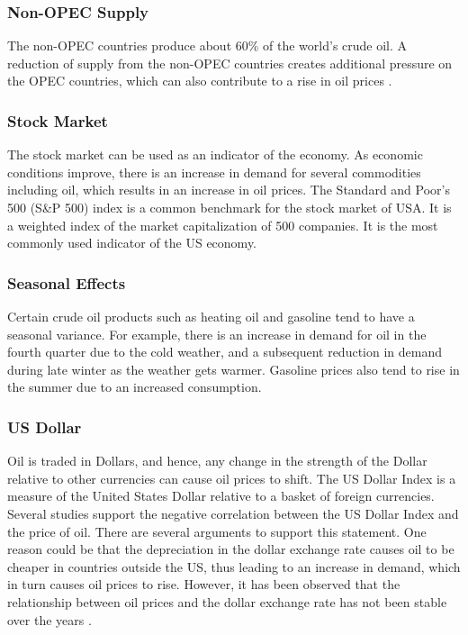 \documentclass[runningheads]{llncs}
\begin{document}
\subsubsection{Non-OPEC Supply}
The non-OPEC countries produce about 60\% of the world's crude oil. A reduction of supply from the non-OPEC countries creates additional pressure on the OPEC countries, which can also contribute to a rise in oil prices \cite{eiafactors}.

\subsubsection{Stock Market}
The stock market can be used as an indicator of the economy. As economic conditions improve, there is an increase in demand for several commodities including oil, which results in an increase in oil prices. The Standard and Poor's 500 (S\&P 500) index is a common benchmark for the stock market of USA. It is a weighted index of the market capitalization of 500 companies. It is the most commonly used indicator of the US economy.

\subsubsection{Seasonal Effects}
Certain crude oil products such as heating oil and gasoline tend to have a seasonal variance. For example, there is an increase in demand for oil in the fourth quarter due to the cold weather, and a subsequent reduction in demand during late winter as the weather gets warmer. Gasoline prices also tend to rise in the summer due to an increased consumption. 

\subsubsection{US Dollar}
Oil is traded in Dollars, and hence, any change in the strength of the Dollar relative to other currencies can cause oil prices to shift. The US Dollar Index is a measure of the United States Dollar relative to a basket of foreign currencies. Several studies support the negative correlation between the US Dollar Index and the price of oil. There are several arguments to support this statement. One reason could be that the depreciation in the dollar exchange rate causes oil to be cheaper in countries outside the US, thus leading to an increase in demand, which in turn causes oil prices to rise. However, it has been observed that the relationship between oil prices and the dollar exchange rate has not been stable over the years \cite{eiafactors} \cite{oildollar}.
\end{document}
